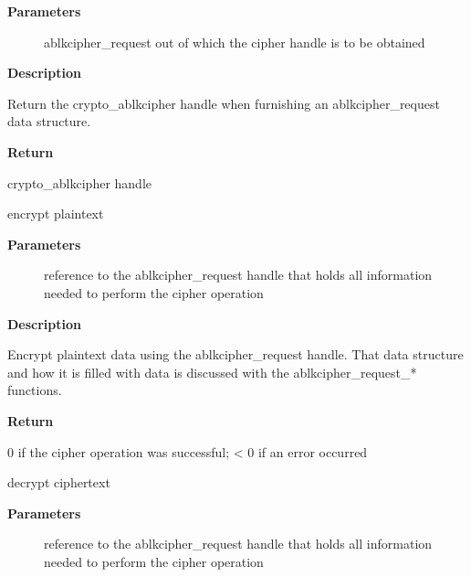 \documentclass[a4paper,8pt,english]{sphinxmanual}
\begin{document}
\textbf{Parameters}
\begin{description}
\item[{}] \leavevmode
ablkcipher\_request out of which the cipher handle is to be obtained

\end{description}

\textbf{Description}

Return the crypto\_ablkcipher handle when furnishing an ablkcipher\_request
data structure.

\textbf{Return}

crypto\_ablkcipher handle

\begin{fulllineitems}
\label{crypto/api-skcipher:c.crypto_ablkcipher_encrypt}
encrypt plaintext

\end{fulllineitems}


\textbf{Parameters}
\begin{description}
\item[{}] \leavevmode
reference to the ablkcipher\_request handle that holds all information
needed to perform the cipher operation

\end{description}

\textbf{Description}

Encrypt plaintext data using the ablkcipher\_request handle. That data
structure and how it is filled with data is discussed with the
ablkcipher\_request\_* functions.

\textbf{Return}

0 if the cipher operation was successful; \textless{} 0 if an error occurred

\begin{fulllineitems}
\label{crypto/api-skcipher:c.crypto_ablkcipher_decrypt}
decrypt ciphertext

\end{fulllineitems}


\textbf{Parameters}
\begin{description}
\item[{}] \leavevmode
reference to the ablkcipher\_request handle that holds all information
needed to perform the cipher operation

\end{description}
\end{document}
